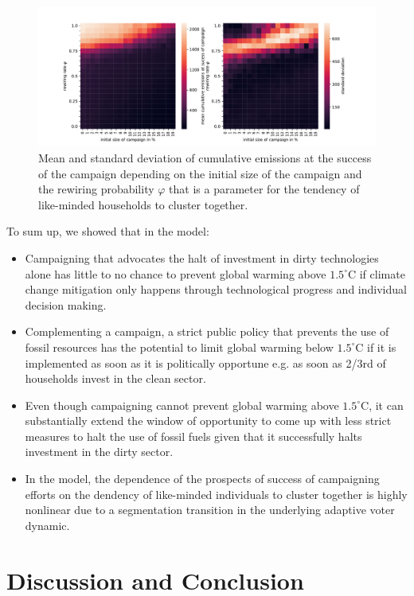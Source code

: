 \begin{figure}[t]
    \centering
    \includegraphics[width = \textwidth]{figures/campaign_vs_phi.pdf}
    \caption{Mean and standard deviation of cumulative emissions at the success of the campaign depending on the initial size of the campaign and the rewiring probability $\varphi$ that is a parameter for the tendency of like-minded households to cluster together. }
    \label{fig:campaign_phi}
\end{figure}

To sum up, we showed that in the model:
\begin{itemize}
  \item Campaigning that advocates the halt of investment in dirty technologies alone has little to no chance to prevent global warming above $1.5^{\circ}$C if climate change mitigation only happens through technological progress and individual decision making.
  \item Complementing a campaign, a strict public policy that prevents the use of fossil resources has the potential to limit global warming below $1.5^{\circ}$C if it is implemented as soon as it is politically opportune e.g. as soon as 2/3rd of households invest in the clean sector.
  \item Even though campaigning cannot prevent global warming above $1.5^{\circ}$C, it can substantially extend the window of opportunity to come up with less strict measures to halt the use of fossil fuels given that it successfully halts investment in the dirty sector.
  \item In the model, the dependence of the prospects of success of campaigning efforts on the dendency of like-minded individuals to cluster together is highly nonlinear due to a segmentation transition in the underlying adaptive voter dynamic.
\end{itemize}

\section{Discussion and Conclusion}
\label{sec:heuristics_conclusion}


